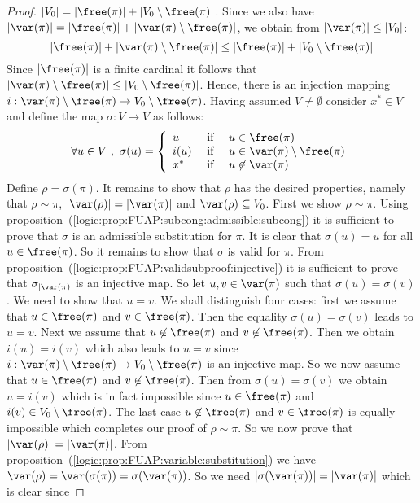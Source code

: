 \begin{proof}
$|V_{0}| =|\free(\pi)|+|V_{0}\setminus\free(\pi)|$. Since we also
have $|\var(\pi)|=|\free(\pi)|+|\var(\pi)\setminus\free(\pi)|$, we
obtain from $|\var(\pi)|\leq|V_{0}|$:
    \[
    |\free(\pi)|+|\var(\pi)\setminus\free(\pi)|\leq|\free(\pi)|
    +|V_{0}\setminus\free(\pi)|
    \]
Since $|\free(\pi)|$ is a finite cardinal it follows that
$|\var(\pi)\setminus\free(\pi)|\leq|V_{0}\setminus\free(\pi)|$.
Hence, there is an injection mapping
$i:\var(\pi)\setminus\free(\pi)\to V_{0}\setminus\free(\pi)$. Having
assumed $V\neq\emptyset$ consider $x^{*}\in V$ and define the map
$\sigma:V\to V$ as follows:
    \[
    \forall u\in V\ ,\ \sigma(u)=\left\{
        \begin{array}{lcl}
        u&\mbox{\ if\ }&u\in\free(\pi)\\
        i(u)&\mbox{\ if\ }&u\in\var(\pi)\setminus\free(\pi)\\
        x^{*}&\mbox{\ if\ }&u\not\in\var(\pi)
        \end{array}
    \right.
    \]
Define $\rho=\sigma(\pi)$. It remains to show that $\rho$ has the
desired properties, namely that $\rho\sim\pi$,
$|\var(\rho)|=|\var(\pi)|$ and $\var(\rho)\subseteq V_{0}$. First we
show $\rho\sim\pi$. Using
proposition~(\ref{logic:prop:FUAP:subcong:admissible:subcong}) it is
sufficient to prove that $\sigma$ is an admissible substitution for
$\pi$. It is clear that $\sigma(u)=u$ for all $u\in\free(\pi)$. So
it remains to show that $\sigma$ is valid for $\pi$. From
proposition~(\ref{logic:prop:FUAP:validsubproof:injective}) it is
sufficient to prove that $\sigma_{|\var(\pi)}$ is an injective map.
So let $u,v\in\var(\pi)$ such that $\sigma(u)=\sigma(v)$. We need to
show that $u=v$. We shall distinguish four cases: first we assume
that $u\in\free(\pi)$ and $v\in\free(\pi)$. Then the equality
$\sigma(u)=\sigma(v)$ leads to $u=v$. Next we assume that
$u\not\in\free(\pi)$ and $v\not\in\free(\pi)$. Then we obtain
$i(u)=i(v)$ which also leads to $u=v$ since
$i:\var(\pi)\setminus\free(\pi)\to V_{0}\setminus\free(\pi)$ is an
injective map. So we now assume that $u\in\free(\pi)$ and
$v\not\in\free(\pi)$. Then from $\sigma(u)=\sigma(v)$ we obtain
$u=i(v)$ which is in fact impossible since $u\in\free(\pi)$ and
$i(v)\in V_{0}\setminus\free(\pi)$. The last case
$u\not\in\free(\pi)$ and $v\in\free(\pi)$ is equally impossible
which completes our proof of $\rho\sim\pi$. So we now prove that
$|\var(\rho)|=|\var(\pi)|$. From
proposition~(\ref{logic:prop:FUAP:variable:substitution}) we have
$\var(\rho)=\var(\sigma(\pi))=\sigma(\var(\pi))$. So we need
$|\sigma(\var(\pi))|=|\var(\pi)|$ which is clear since

\end{proof}

